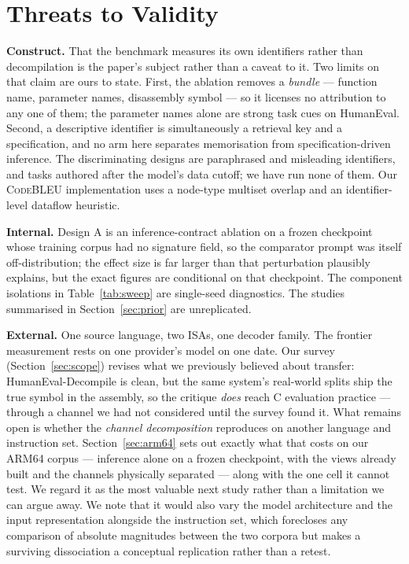 \documentclass[conference]{IEEEtran}
\newcommand{\codebleu}{\textsc{CodeBLEU}\xspace}
\begin{document}
\section{Threats to Validity}
\textbf{Construct.} That the benchmark measures its own identifiers rather than
decompilation is the paper's subject rather than a caveat to it. Two limits on
that claim are ours to state. First, the ablation removes a \emph{bundle} ---
function name, parameter names, disassembly symbol --- so it licenses no
attribution to any one of them; the parameter names alone are strong task cues on
HumanEval. Second, a descriptive identifier is simultaneously a retrieval key and
a specification, and no arm here separates memorisation from specification-driven
inference. The discriminating designs are paraphrased and misleading identifiers,
and tasks authored after the model's data cutoff; we have run none of them. Our
\codebleu implementation uses a node-type multiset overlap and an
identifier-level dataflow heuristic.

\textbf{Internal.} Design A is an inference-contract ablation on a frozen
checkpoint whose training corpus had no signature field, so the comparator prompt
was itself off-distribution; the effect size is far larger than that perturbation
plausibly explains, but the exact figures are conditional on that checkpoint. The
component isolations in Table~\ref{tab:sweep} are single-seed diagnostics. The
studies summarised in Section~\ref{sec:prior} are unreplicated.

\textbf{External.} One source language, two ISAs, one decoder family. The
frontier measurement rests on one provider's model on one date. Our survey
(Section~\ref{sec:scope}) revises what we previously believed about transfer:
HumanEval-Decompile is clean, but the same system's real-world splits ship the
true symbol in the assembly, so the critique \emph{does} reach C evaluation
practice --- through a channel we had not considered until the survey found it.
What remains open is whether the \emph{channel decomposition} reproduces on
another language and instruction set.
Section~\ref{sec:arm64} sets out exactly what that costs on our ARM64 corpus ---
inference alone on a frozen checkpoint, with the views already built and the
channels physically separated --- along with the one cell it cannot test. We
regard it as the most valuable next study rather than a limitation we can argue
away. We note that it would also vary the model architecture and the input
representation alongside the instruction set, which forecloses any comparison of
absolute magnitudes between the two corpora but makes a surviving dissociation a
conceptual replication rather than a retest.
\end{document}
